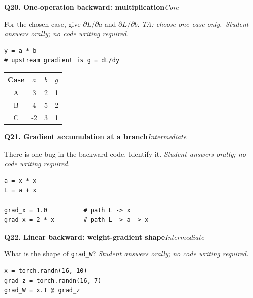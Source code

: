 \documentclass[11pt]{article}
\newif\ifshowanswers
\newenvironment{question}[3]{%
  \par\medskip
  \noindent\textbf{Q#1. #2}\hfill\textit{#3}\par\smallskip
}{\par\medskip}
\newcommand{\answer}[1]{%
  \ifshowanswers
    \begin{quote}\small\textbf{Expected answer:} #1\end{quote}
  \fi
}
\newcommand{\marking}[1]{%
  \ifshowanswers
    \begin{quote}\small\textbf{1 mark:} #1\end{quote}
  \fi
}
\newcommand{\casesnote}{\textit{TA: choose one case only.}}
\newcommand{\oralnote}{\textit{Student answers orally; no code writing required.}}
\begin{document}
\begin{question}{20}{One-operation backward: multiplication}{Core}
For the chosen case, give $\partial L/\partial a$ and $\partial L/\partial b$. \casesnote \ \oralnote

\begin{lstlisting}
y = a * b
# upstream gradient is g = dL/dy
\end{lstlisting}

\begin{center}
\begin{tabular}{cccc}
\toprule
Case & $a$ & $b$ & $g$ \\
\midrule
A & 3 & 2 & 1 \\
B & 4 & 5 & 2 \\
C & -2 & 3 & 1 \\
\bottomrule
\end{tabular}
\end{center}

\answer{Use $\partial L/\partial a=g\,b$ and $\partial L/\partial b=g\,a$. A: $(2,3)$. B: $(10,8)$. C: $(3,-2)$.}
\marking{Correct two gradients for the chosen case.}
\end{question}

\begin{question}{21}{Gradient accumulation at a branch}{Intermediate}
There is one bug in the backward code. Identify it. \oralnote

\begin{lstlisting}
a = x * x
L = a + x

grad_x = 1.0          # path L -> x
grad_x = 2 * x        # path L -> a -> x
\end{lstlisting}

\answer{The second assignment overwrites the gradient from the first path. Because $x$ influences $L$ through two paths, the contributions must be added: $dL/dx = 1 + 2x$.}
\marking{Student identifies that gradients from multiple graph paths must accumulate rather than overwrite one another.}
\end{question}

\begin{question}{22}{Linear backward: weight-gradient shape}{Intermediate}
What is the shape of \texttt{grad\_W}? \oralnote

\begin{lstlisting}
x = torch.randn(16, 10)
grad_z = torch.randn(16, 7)
grad_W = x.T @ grad_z
\end{lstlisting}

\answer{\texttt{x.T} has shape $(10,16)$ and \texttt{grad\_z} has shape $(16,7)$, so \texttt{grad\_W} has shape $(10,7)$, matching the weight matrix shape.}
\marking{Student gives $(10,7)$.}
\end{question}
\end{document}
